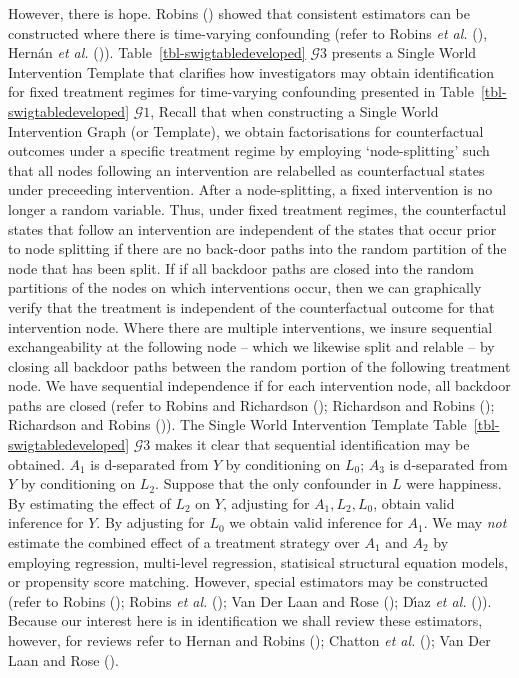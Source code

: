 \documentclass[
  single column]{article}
\begin{document}
However, there is hope. Robins () showed
that consistent estimators can be constructed where there is
time-varying confounding (refer to Robins \emph{et al.}
(), Hernán \emph{et al.}
()).
Table~\ref{tbl-swigtabledeveloped} \(\mathcal{G}3\) presents a Single
World Intervention Template that clarifies how investigators may obtain
identification for fixed treatment regimes for time-varying confounding
presented in Table~\ref{tbl-swigtabledeveloped} \(\mathcal{G}1\), Recall
that when constructing a Single World Intervention Graph (or Template),
we obtain factorisations for counterfactual outcomes under a specific
treatment regime by employing `node-splitting' such that all nodes
following an intervention are relabelled as counterfactual states under
preceeding intervention. After a node-splitting, a fixed intervention is
no longer a random variable. Thus, under fixed treatment regimes, the
counterfactul states that follow an intervention are independent of the
states that occur prior to node splitting if there are no back-door
paths into the random partition of the node that has been split. If if
all backdoor paths are closed into the random partitions of the nodes on
which interventions occur, then we can graphically verify that the
treatment is independent of the counterfactual outcome for that
intervention node. Where there are multiple interventions, we insure
sequential exchangeability at the following node -- which we likewise
split and relable -- by closing all backdoor paths between the random
portion of the following treatment node. We have sequential independence
if for each intervention node, all backdoor paths are closed (refer to
Robins and Richardson ();
Richardson and Robins ();
Richardson and Robins ()).
The Single World Intervention Template
Table~\ref{tbl-swigtabledeveloped} \(\mathcal{G}3\) makes it clear that
sequential identification may be obtained. \(A_1\) is d-separated from
\(Y\) by conditioning on \(L_0\); \(A_3\) is d-separated from \(Y\) by
conditioning on \(L_2\). Suppose that the only confounder in \(L\) were
happiness. By estimating the effect of \(L_2\) on \(Y\), adjusting for
\(A_1, L_2, L_0\), obtain valid inference for \(Y\). By adjusting for
\(L_0\) we obtain valid inference for \(A_1\). We may \emph{not}
estimate the combined effect of a treatment strategy over \(A_1\) and
\(A_2\) by employing regression, multi-level regression, statisical
structural equation models, or propensity score matching. However,
special estimators may be constructed (refer to Robins
(); Robins \emph{et al.}
(); Van Der Laan and Rose
(); Dı́az \emph{et al.}
()). Because our interest here
is in identification we shall review these estimators, however, for
reviews refer to Hernan and Robins
(); Chatton \emph{et al.}
(); Van Der Laan and Rose
().
\end{document}
